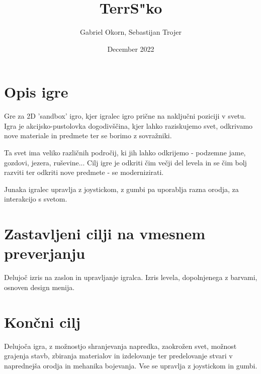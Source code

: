 \documentclass[a4paper] {article}
\title{TerrS"ko}
\author{Gabriel Okorn, Sebastijan Trojer}
\date{December 2022}
\begin{document}
\maketitle

\section{Opis igre}
Gre za 2D 'sandbox' igro, kjer igralec igro prične na naključni poziciji v svetu. Igra je akcijsko-pustolovka dogodivščina, kjer lahko raziskujemo svet, odkrivamo nove materiale in predmete ter se borimo z sovražniki. 

Ta svet ima veliko različnih področij, ki jih lahko odkrijemo - podzemne jame, gozdovi, jezera, ruševine... Cilj igre je odkriti čim večji del levela in se čim bolj razviti ter odkriti nove predmete - se modernizirati.

Junaka igralec upravlja z joystickom, z gumbi pa uporablja razna orodja, za interakcijo s svetom. 

\section{Zastavljeni cilji na vmesnem preverjanju}
Delujoč izris na zaslon in upravljanje igralca. Izris levela, dopolnjenega z barvami, osnoven design menija.

\section{Končni cilj}
Delujoča igra, z možnostjo shranjevanja napredka, zaokrožen svet, možnost grajenja stavb, zbiranja materialov in izdelovanje ter predelovanje stvari v naprednejša orodja in mehanika bojevanja. Vse se upravlja z joystickom in gumbi.
\end{document}
